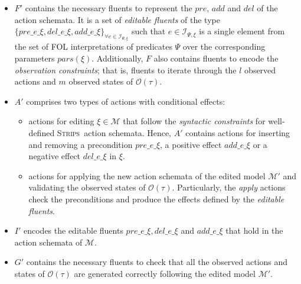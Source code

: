 \documentclass[letterpaper]{article} %
\newcommand{\strips}{\textsc{Strips}}     %
\begin{document}
\begin{itemize}
\item $F'$ contains the necessary fluents to represent the $pre$, $add$ and $del$ of the action schemata. It is a set of \emph{editable fluents} of the type $\{pre\_e\_\xi, del\_e\_\xi, add\_e\_\xi\}_{\forall e\in{\mathcal I}_{\Psi,\xi}}$ such that $e\in{\mathcal I}_{\Psi,\xi}$ is a single element from the set of FOL interpretations of predicates $\Psi$ over the corresponding parameters $pars(\xi)$. Additionally, $F$ also contains fluents to encode the \emph{observation constraints}; that is, fluents to iterate through the $l$ observed actions and $m$ observed states of $\mathcal{O(\tau)}$.
\item $A'$ comprises two types of actions with conditional effects:
    \begin{itemize}
    \item actions for editing $\xi \in \mathcal{M}$ that follow the \emph{syntactic constraints} for well-defined \strips\ action schemata. Hence, $A'$ contains actions for inserting and removing a precondition $pre\_e\_\xi$, a positive effect $add\_e\_\xi$ or a negative effect $del\_e\_\xi$ in $\xi$.
    \item actions for applying the new action schemata of the edited model $\mathcal{M'}$ and validating the observed states of $\mathcal{O(\tau)}$. Particularly, the \emph{apply} actions check the preconditions and produce the effects defined by the \emph{editable fluents}.
    \end{itemize}
\item $I'$ encodes the editable fluents $pre\_e\_\xi, del\_e\_\xi$ and $add\_e\_\xi$ that hold in the action schemata of $\mathcal{M}$.
\item $G'$ contains the necessary fluents to check that all the observed actions and states of $\mathcal{O(\tau)}$ are generated correctly following the edited model $\mathcal{M'}$.
\end{itemize}
\end{document}
